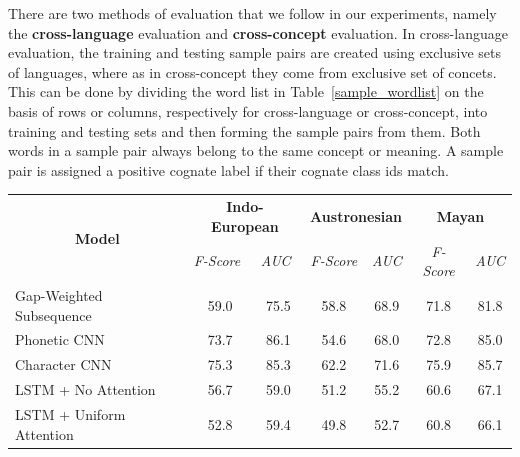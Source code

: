 \documentclass[11pt,letterpaper]{article}
\begin{document}
There are two methods of evaluation that we follow in our experiments, namely the \textbf{cross-language} evaluation and \textbf{cross-concept} evaluation. In cross-language evaluation, the training and testing sample pairs are created using exclusive sets of languages, where as in cross-concept they come from exclusive set of concets. This can be done by dividing the word list in Table~\ref{sample_wordlist} on the basis of rows or columns, respectively for cross-language or cross-concept, into training and testing sets and then forming the sample pairs from them. Both words in a sample pair always belong to the same concept or meaning. A sample pair is assigned a positive cognate label if their cognate class ids match. 

\begin{table}[t]
\centering
\begin{tabular}{lcccccc}
\multicolumn{1}{c}{\multirow{2}{*}{\textbf{Model}}} & \multicolumn{2}{c}{\textbf{Indo-European}}                              & \multicolumn{2}{c}{\textbf{Austronesian}} & \multicolumn{2}{c}{\textbf{Mayan}} \\ \cline{2-7} 
\multicolumn{1}{c}{}                                & \multicolumn{1}{l}{\textit{F-Score}} & \multicolumn{1}{l}{\textit{AUC}} & \textit{F-Score}      & \textit{AUC}      & \textit{F-Score}  & \textit{AUC}   \\ \hline 
Gap-Weighted Subsequence                            & 59.0                                 & 75.5                             & 58.8                  & 68.9              & 71.8              & 81.8           \\
Phonetic CNN                                        & 73.7                                 & 86.1                             & 54.6                  & 68.0              & 72.8              & 85.0           \\
Character CNN                                       & 75.3                                 & 85.3                             & 62.2                  & 71.6              & 75.9              & 85.7           \\
LSTM + No Attention                                 & 56.7                                 & 59.0                             & 51.2                  & 55.2              & 60.6              & 67.1           \\
LSTM + Uniform Attention                            & 52.8                                 & 59.4                             & 49.8                  & 52.7              & 60.8              & 66.1           \\ \hline

\end{tabular}
\end{table}
\end{document}

